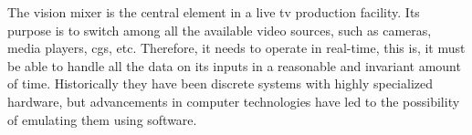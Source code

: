 \documentclass[../main.tex]{subfiles}
\begin{document}
The vision mixer is the central element in a live \gls{tv} production facility. Its purpose is to switch among all the available video sources, such as cameras, media players, \glspl{cg}, etc. Therefore, it needs to operate in real-time, this is, it must be able to handle all the data on its inputs in a reasonable and invariant amount of time. Historically they have been discrete systems with highly specialized hardware, but advancements in computer technologies have led to the possibility of emulating them using software.\newline
\end{document}
